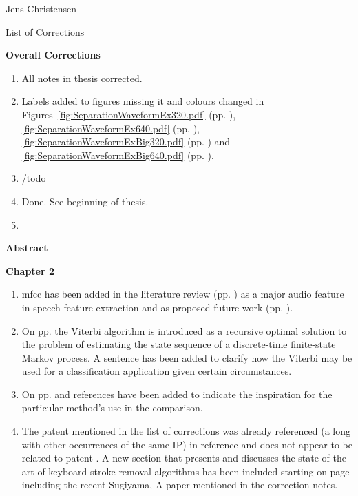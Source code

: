\clearpage
\thispagestyle{empty}
Jens Christensen

List of Corrections

\textbf{Overall Corrections}

\begin{enumerate}
  \item All notes in thesis corrected.
  \item Labels added to figures missing it and colours changed in Figures~\ref{fig:SeparationWaveformEx320.pdf} (pp. \pageref{fig:SeparationWaveformEx320.pdf}), \ref{fig:SeparationWaveformEx640.pdf} (pp. \pageref{fig:SeparationWaveformEx640.pdf}), \ref{fig:SeparationWaveformExBig320.pdf} (pp. \pageref{fig:SeparationWaveformExBig320.pdf}) and \ref{fig:SeparationWaveformExBig640.pdf} (pp. \pageref{fig:SeparationWaveformExBig640.pdf}).
  \item /todo
  \item Done. See beginning of thesis.
  \item
\end{enumerate}

\textbf{Abstract}

\textbf{Chapter 2}
\begin{enumerate}
\item \gls{mfcc} has been added in the literature review (pp. \pageref{corrections:mfcc1}) as a major audio feature in speech feature extraction and as proposed future work (pp. \pageref{corrections:mfcc2}).
    \item On pp. \pageref{corrections:viterbi} the Viterbi algorithm is introduced as a recursive optimal solution to the problem of estimating the state sequence of a discrete-time finite-state Markov process. A sentence has been added to clarify how the Viterbi may be used for a classification application given certain circumstances.
    \item On pp. \pageref{fig:LitRev_DetectCompare} and \pageref{fig:LitRev_DetectCompare2} references have been added to indicate the inspiration for the particular method's use in the comparison.
    \item The patent mentioned in the list of corrections was already referenced (a long with other occurrences of the same IP) in reference \cite{Seltzer2011Patent} and does not appear to be related to patent \cite{US8233353}. A new section that presents and discusses the state of the art of keyboard stroke removal algorithms has been included starting on page \pageref{corrections:methods} including the recent Sugiyama, A paper mentioned in the correction notes.
    \end{enumerate}
    

